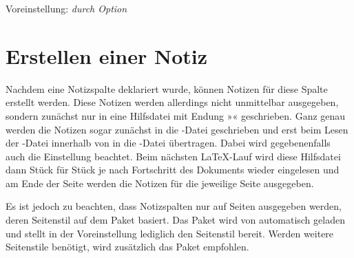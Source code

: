 \begin{desclist}
{      Voreinstellung: \emph{durch Option }%
    }%
\end{desclist}
\EndIndexGroup


\section{Erstellen einer Notiz}

Nachdem eine Notizspalte deklariert wurde, können Notizen für diese Spalte
erstellt werden. Diese Notizen werden allerdings nicht unmittelbar ausgegeben,
sondern zunächst nur in eine Hilfsdatei mit Endung »«
geschrieben. Ganz genau werden die Notizen sogar zunächst in die
-Datei geschrieben und erst beim Lesen der -Datei
innerhalb von  in die -Datei
übertragen. Dabei wird gegebenenfalls auch die Einstellung
 beachtet.  Beim nächsten \LaTeX-Lauf wird
diese Hilfsdatei dann Stück für Stück je nach Fortschritt des Dokuments wieder
eingelesen und am Ende der Seite werden die Notizen für die jeweilige Seite
ausgegeben.

\iffree{}{\pagebreak}%
Es ist jedoch zu beachten, dass Notizspalten nur auf Seiten
ausgegeben werden, deren Seitenstil auf dem Paket
\hyperref[cha:scrlayer]{}%
 basiert. Das Paket
\hyperref[cha:scrlayer]{} wird von
 automatisch geladen und stellt in der
Voreinstellung lediglich den Seitenstil
 bereit. Werden weitere Seitenstile
benötigt, wird zusätzlich das Paket
\hyperref[cha:scrlayer-scrpage]{}%
%
empfohlen.



